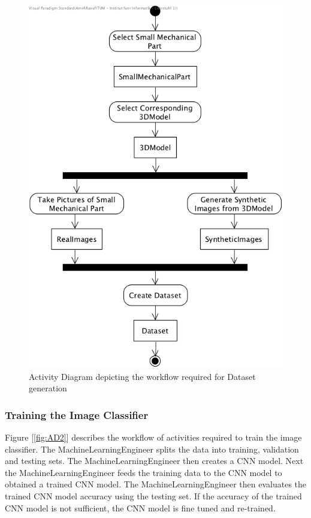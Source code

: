 \documentclass[a4paper,12pt,twoside]{report}
\begin{document}
\begin{figure}[h]
\centering
  \includegraphics[width=\textwidth]{AD1}
\caption{Activity Diagram depicting the workflow required for Dataset generation}
\label{fig:AD1}
\end{figure}

\subsubsection{Training the Image Classifier}

Figure [\ref{fig:AD2}] describes the workflow of activities required to train the image classifier. The MachineLearningEngineer splits the data into training, validation and testing sets. The MachineLearningEngineer then creates a CNN model. Next the MachineLearningEngineer feeds the training data to the CNN model to obtained a trained CNN model. The MachineLearningEngineer then evaluates the trained CNN model accuracy using the testing set. If the accuracy of the trained CNN model is not sufficient, the CNN model is fine tuned and re-trained.
\end{document}
